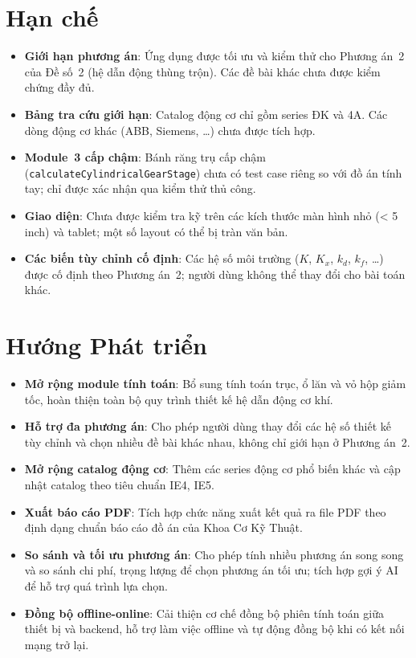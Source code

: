\section{Hạn chế}
\label{sec:conclusion-limitations}

\begin{itemize}
  \item \textbf{Giới hạn phương án}: Ứng dụng được tối ưu và kiểm thử cho
        Phương án~2 của Đề số~2 (hệ dẫn động thùng trộn).
        Các đề bài khác chưa được kiểm chứng đầy đủ.
  \item \textbf{Bảng tra cứu giới hạn}: Catalog động cơ chỉ gồm series ĐK và 4A.
        Các dòng động cơ khác (ABB, Siemens, \ldots) chưa được tích hợp.
  \item \textbf{Module~3 cấp chậm}: Bánh răng trụ cấp chậm
        (\texttt{calculateCylindricalGearStage}) chưa có test case
        riêng so với đồ án tính tay; chỉ được xác nhận qua kiểm thử thủ công.
  \item \textbf{Giao diện}: Chưa được kiểm tra kỹ trên các kích thước màn hình
        nhỏ (< 5 inch) và tablet; một số layout có thể bị tràn văn bản.
  \item \textbf{Các biến tùy chỉnh cố định}: Các hệ số môi trường
        ($K$, $K_x$, $k_d$, $k_f$, \ldots) được cố định theo Phương án~2;
        người dùng không thể thay đổi cho bài toán khác.
\end{itemize}

\section{Hướng Phát triển}
\label{sec:conclusion-future}

\begin{itemize}
  \item \textbf{Mở rộng module tính toán}: Bổ sung tính toán trục, ổ lăn và vỏ hộp giảm tốc,
        hoàn thiện toàn bộ quy trình thiết kế hệ dẫn động cơ khí.
  \item \textbf{Hỗ trợ đa phương án}: Cho phép người dùng thay đổi các hệ số
        thiết kế tùy chỉnh và chọn nhiều đề bài khác nhau,
        không chỉ giới hạn ở Phương án~2.
  \item \textbf{Mở rộng catalog động cơ}: Thêm các series động cơ phổ biến
        khác và cập nhật catalog theo tiêu chuẩn IE4, IE5.
  \item \textbf{Xuất báo cáo PDF}: Tích hợp chức năng xuất kết quả ra file PDF
        theo định dạng chuẩn báo cáo đồ án của Khoa Cơ Kỹ Thuật.
  \item \textbf{So sánh và tối ưu phương án}: Cho phép tính nhiều phương án
        song song và so sánh chi phí, trọng lượng để chọn phương án tối ưu;
        tích hợp gợi ý AI để hỗ trợ quá trình lựa chọn.
  \item \textbf{Đồng bộ offline-online}: Cải thiện cơ chế đồng bộ phiên tính toán
        giữa thiết bị và backend, hỗ trợ làm việc offline và tự động đồng bộ
        khi có kết nối mạng trở lại.
\end{itemize}
